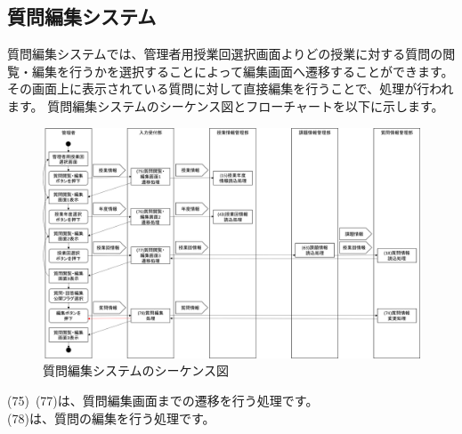 \subsection{質問編集システム}
質問編集システムでは、管理者用授業回選択画面よりどの授業に対する質問の閲覧・編集を行うかを選択することによって編集画面へ遷移することができます。
その画面上に表示されている質問に対して直接編集を行うことで、処理が行われます。
質問編集システムのシーケンス図とフローチャートを以下に示します。

\begin{figure}[htbp]
  \begin{center}
    \includegraphics[width=1\linewidth,clip]{./img/seq20.png}
    \caption{質問編集システムのシーケンス図}\label{fig:seq20}
  \end{center}
\end{figure}

(75)~(77)は、質問編集画面までの遷移を行う処理です。\\
(78)は、質問の編集を行う処理です。

